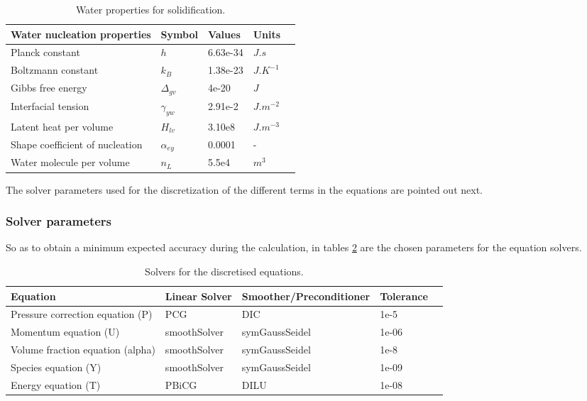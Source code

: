 \begin{table}[h!]
	\begin{tabular}{@{}lllll@{}}
		\toprule[1pt]
		\textbf{Water nucleation properties} & \textbf{Symbol} & \textbf{Values} & \textbf{Units} &  \\ \midrule[2pt]
		Planck constant & $h$ & 6.63e-34 & $J.s$ \\
		Boltzmann constant & $k_{B}$ & 1.38e-23 & $J.K^{-1}$ \\		
		Gibbs free energy & $\Delta_{gv}$ & 4e-20 & $J$ \\
		Interfacial tension & $\gamma_{yw}$ & 2.91e-2 & $J.m^{-2}$ \\		
		Latent heat per volume & $H_{lv}$ & 3.10e8 & $J.m^{-3}$ \\
		Shape coefficient of nucleation & $\alpha_{ey}$ & 0.0001 & - \\		
		Water molecule per volume & $n_{L}$ &  5.5e4  & $m^{3}$ \\		 \bottomrule[1pt]		
	\end{tabular}
	\centering
	\caption{Water properties for solidification.}	
	\label{3.11tab}
\end{table}
The solver parameters used for the discretization of the different terms in the equations are pointed out next. 

\subsubsection*{Solver parameters}
So as to obtain a minimum expected accuracy during the calculation, in tables \ref{3.13tab} are the chosen parameters for the equation solvers.
\clearpage
\begin{table}[h!]
\begin{adjustbox}{width=1\textwidth}
	\small		
	\begin{tabular}{@{}lllll@{}}
		\toprule[1pt]
		\textbf{Equation} & \textbf{Linear Solver} & \textbf{Smoother/Preconditioner} & \textbf{Tolerance} &  \\ \midrule[2pt]
		Pressure correction equation (P) & PCG & DIC & 1e-5 \\
		Momentum equation (U)& smoothSolver & symGaussSeidel  & 1e-06 \\
		Volume fraction equation (alpha) & smoothSolver & symGaussSeidel  & 1e-8 \\
		Species equation  (Y)   & smoothSolver   & symGaussSeidel &1e-09 \\		 
		Energy equation (T)    &  PBiCG  &  DILU
		&  1e-08  \\ \bottomrule[1pt]		
	\end{tabular}
\end{adjustbox}
	\centering
	\caption{Solvers for the discretised equations.}	
	\label{3.13tab}
\end{table}
\clearpage
